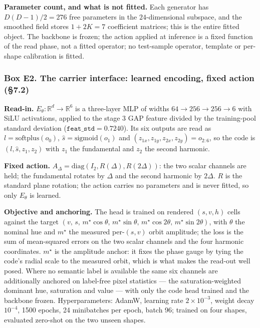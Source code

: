\textbf{Parameter count, and what is not fitted.} Each generator has $D(D-1)/2=276$ free parameters in the $24$-dimensional subspace, and the smoothed field stores $1+2K=7$ coefficient matrices; this is the entire fitted object. The backbone is frozen; the action applied at inference is a fixed function of the read phase, not a fitted operator; no test-sample operator, template or per-shape calibration is fitted.

\subsubsection*{Box E2. The carrier interface: learned encoding, fixed action (\S{}7.2)}

\textbf{Read-in.} $E_\theta:\mathbb{R}^{d}\to\mathbb{R}^6$ is a three-layer MLP of widths $64\to256\to256\to6$ with SiLU activations, applied to the stage 3 GAP feature divided by the training-pool standard deviation ($\texttt{feat\_std}=0.7240$). Its six outputs are read as $l=\mathrm{softplus}(o_0)$, $\hat s=\mathrm{sigmoid}(o_1)$ and $(z_{1x},z_{1y},z_{2x},z_{2y})=o_{2:6}$, so the code is $(l,\hat s,z_1,z_2)$ with $z_1$ the fundamental and $z_2$ the second harmonic.

\textbf{Fixed action.} $A_\Delta=\mathrm{diag}(I_2,R(\Delta),R(2\Delta))$: the two scalar channels are held; the fundamental rotates by $\Delta$ and the second harmonic by $2\Delta$. $R$ is the standard plane rotation; the action carries no parameters and is never fitted, so only $E_\theta$ is learned.

\textbf{Objective and anchoring.} The head is trained on rendered $(s,v,h)$ cells against the target $(v,\,s,\,m^\star\cos\theta,\,m^\star\sin\theta,\,m^\star\cos2\theta,\,m^\star\sin2\theta)$, with $\theta$ the nominal hue and $m^\star$ the measured per-$(s,v)$ orbit amplitude; the loss is the sum of mean-squared errors on the two scalar channels and the four harmonic coordinates. $m^\star$ is the amplitude anchor: it fixes the phase gauge by tying the code's radial scale to the measured orbit, which is what makes the read-out well posed. Where no semantic label is available the same six channels are additionally anchored on label-free pixel statistics --- the saturation-weighted dominant hue, saturation and value --- with only the code head trained and the backbone frozen. Hyperparameters: AdamW, learning rate $2\times10^{-3}$, weight decay $10^{-4}$, 1500 epochs, 24 minibatches per epoch, batch 96; trained on four shapes, evaluated zero-shot on the two unseen shapes.

